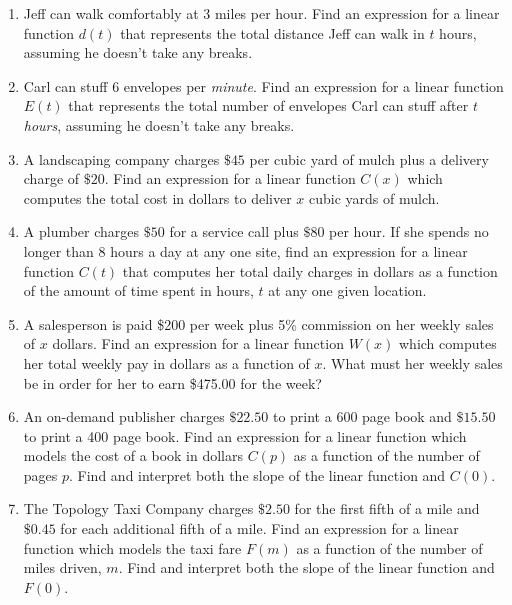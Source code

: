 \documentclass{ximera}
\begin{document}
\begin{enumerate}

\setcounter{enumi}{\value{HW}}


\item  Jeff can walk comfortably at $3$ miles per hour.  Find an expression for a linear function $d(t)$ that represents the total distance Jeff can walk in $t$ hours, assuming he doesn't take any breaks.

\item  Carl can stuff $6$ envelopes per \textit{minute}.  Find an expression for a linear function $E(t)$ that represents the total number of envelopes Carl can stuff after $t$ \textit{hours}, assuming he doesn't take any breaks.

\item  A landscaping company charges $\$45$ per cubic yard of mulch plus a delivery charge of $\$20$.  Find an expression for a  linear function $C(x)$ which computes the total cost in dollars  to deliver $x$ cubic yards of mulch.

\item  A plumber charges $\$50$ for a service call plus $\$80$ per hour.  If she spends no longer than 8 hours a day at any one site, find an expression for a  linear function $C(t)$ that computes her total daily charges in dollars as a function of the amount of time spent in hours, $t$  at any one given location.

\item A salesperson is paid \$200 per week plus 5\% commission on her weekly sales of $x$ dollars.  Find an expression for a  linear function $W(x)$ which computes her total weekly pay in dollars as a function of $x$.  What must her weekly sales be in order for her to earn \$475.00 for the week?


\item  An on-demand publisher charges $\$22.50$ to print a 600 page book and $\$15.50$ to print a 400 page book.  Find an expression for a linear function which models the cost of a book in dollars $C(p)$ as a function of the number of pages $p$.  Find and interpret both the slope of the linear function  and $C(0)$.

\item The Topology Taxi Company charges $\$2.50$ for the first fifth of a mile and $\$0.45$ for each additional fifth of a mile.  Find an expression for a  linear function which models the taxi fare $F(m)$ as a function of the number of miles driven, $m$.  Find and interpret both the slope of the linear function  and $F(0)$.


\end{enumerate}
\end{document}
